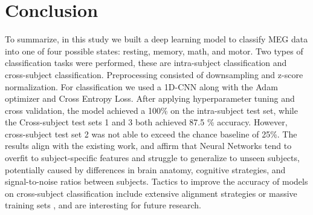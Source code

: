\documentclass[conference]{IEEEtran}
\begin{document}
\section{Conclusion}
To summarize, in this study we built a deep learning model to classify MEG data into one of four possible states: resting, memory, math, and motor.
Two types of classification tasks were performed, these are intra-subject classification and cross-subject classification.
Preprocessing consisted of downsampling and z-score normalization.
For classification we used a 1D-CNN along with the Adam optimizer and Cross Entropy Loss.
After applying hyperparameter tuning and cross validation, the model achieved a 100\% on the intra-subject test set, while the Cross-subject test sets 1 and 3 both achieved 87.5 \% accuracy.
However, cross-subject test set 2 was not able to exceed the chance baseline of 25\%. 
The results align with the existing work, and affirm that Neural Networks tend to overfit to subject-specific features and struggle to generalize to unseen subjects, potentially caused by differences in brain anatomy, cognitive strategies, and signal-to-noise ratios between subjects.
Tactics to improve the accuracy of models on cross-subject classification include extensive alignment strategies or massive training sets \cite{Frontiers2020}, and are interesting for future research.



\end{document}
